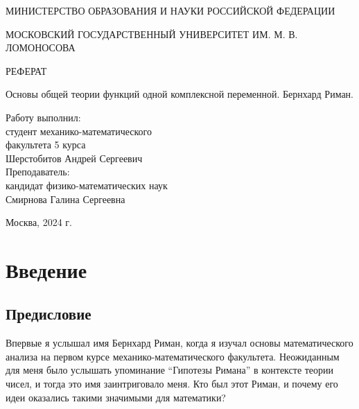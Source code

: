 \documentclass[a4paper,12pt]{article}
\theoremstyle{remark}
\begin{document}
\begin{center}
  {\small МИНИСТЕРСТВО ОБРАЗОВАНИЯ И НАУКИ РОССИЙСКОЙ ФЕДЕРАЦИИ}

  \vspace{0.1cm}

  {\small МОСКОВСКИЙ ГОСУДАРСТВЕННЫЙ УНИВЕРСИТЕТ ИМ. М. В. ЛОМОНОСОВА}
  \vspace{4.5cm}


  {\Huge\textsc{РЕФЕРАТ}\\[5mm]}

  {\Large  Основы общей теории функций одной комплексной
    переменной. Бернхард Риман.}
  \bigskip

  \vspace{0.25cm}
\end{center}

\vfill

\hfill\begin{minipage}{0.55\linewidth}
  Работу выполнил: \\
  студент механико-математического \\
  факультета 5 курса\\
  Шерстобитов Андрей Сергеевич\\
  Преподаватель:\\
  кандидат физико-математических наук \\
  Смирнова Галина Сергеевна\\
\end{minipage}

\vfill

\begin{center}
  Москва, 2024 г.
\end{center}

\thispagestyle{empty}
\newpage

\tableofcontents

\thispagestyle{empty}
\newpage

\section{Введение}

\subsection{Предисловие}

Впервые я услышал имя Бернхард Риман, когда я изучал основы
математического анализа на первом курсе механико-математического
факультета. Неожиданным для меня было услышать упоминание
``Гипотезы Римана'' в контексте теории чисел,
и тогда это имя заинтриговало меня. Кто был этот Риман,
и почему его идеи оказались такими значимыми для математики?
\end{document}
